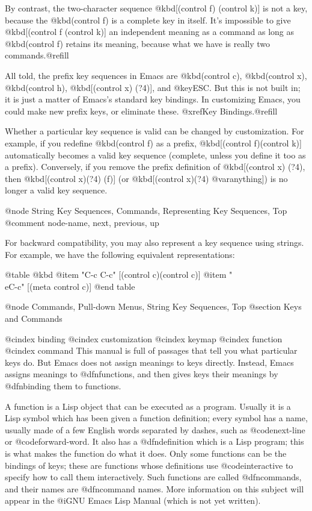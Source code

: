 {{  By contrast, the two-character sequence @kbd{[(control f) (control
k)]} is not a key, because the @kbd{(control f)} is a complete key in
itself.  It's impossible to give @kbd{[(control f (control k)]} an
independent meaning as a command as long as @kbd{(control f)} retains its
meaning, because what we have is really two commands.@refill

  All told, the prefix key sequences in Emacs are @kbd{(control c)},
@kbd{(control x)}, @kbd{(control h)}, @kbd{[(control x) (?4)]}, and
@key{ESC}.  But this is not built in; it is just a matter of Emacs's
standard key bindings.  In customizing Emacs, you could make new prefix
keys, or eliminate these.  @xref{Key Bindings}.@refill

  Whether a particular key sequence is valid can be changed by
customization.  For example, if you redefine @kbd{(control f)} as a
prefix, @kbd{[(control f)(control k)]} automatically becomes a valid key
sequence (complete, unless you define it too as a prefix).  Conversely, if you
remove the prefix definition of @kbd{[(control x) (?4)}, 
then @kbd{[(control x)(?4) (f)]} (or
@kbd{[(control x)(?4) @var{anything}]}) is no longer a valid key 
sequence.

@node String Key Sequences, Commands, Representing Key Sequences, Top
@comment  node-name,  next,  previous,  up

For backward compatibility, you may also represent a key sequence
using strings.  For example, we have the following 
equivalent representations:

@table @kbd
@item "C-c C-c"
[(control c)(control c)]
@item "\\eC-c"
[(meta control c)]
@end table

@node Commands, Pull-down Menus, String Key Sequences, Top
@section Keys and Commands

@cindex binding
@cindex customization
@cindex keymap
@cindex function
@cindex command
  This manual is full of passages that tell you what particular keys do.
But Emacs does not assign meanings to keys directly.  Instead, Emacs
assigns meanings to @dfn{functions}, and then gives keys their meanings by
@dfn{binding} them to functions.

  A function is a Lisp object that can be executed as a program.  Usually
it is a Lisp symbol which has been given a function definition; every
symbol has a name, usually made of a few English words separated by dashes,
such as @code{next-line} or @code{forward-word}.  It also has a
@dfn{definition} which is a Lisp program; this is what makes the function
do what it does.  Only some functions can be the bindings of keys; these
are functions whose definitions use @code{interactive} to specify how to
call them interactively.  Such functions are called @dfn{commands}, and
their names are @dfn{command names}.  More information on this subject will
appear in the @i{GNU Emacs Lisp Manual} (which is not yet written).

}}

